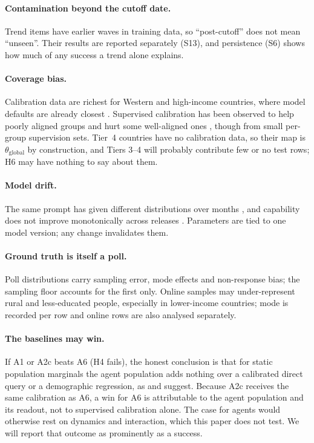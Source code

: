 \documentclass[11pt]{article}
\begin{document}
\paragraph{Contamination beyond the cutoff date.} Trend items have earlier waves in training data, so ``post-cutoff'' does not mean ``unseen''. Their results are reported separately (S13), and persistence (S6) shows how much of any success a trend alone explains.

\paragraph{Coverage bias.} Calibration data are richest for Western and high-income countries, where model defaults are already closest \citep{durmus2023global,tao2024cultural}. Supervised calibration has been observed to help poorly aligned groups and hurt some well-aligned ones \citep{kambhatla2025supervision}, though from small per-group supervision sets. Tier~4 countries have no calibration data, so their map is $\theta_{\text{global}}$ by construction, and Tiers 3--4 will probably contribute few or no test rows; H6 may have nothing to say about them.

\paragraph{Model drift.} The same prompt has given different distributions over months \citep{bisbee2024synthetic}, and capability does not improve monotonically across releases \citep{lee2026openweight}. Parameters are tied to one model version; any change invalidates them.

\paragraph{Ground truth is itself a poll.} Poll distributions carry sampling error, mode effects and non-response bias; the sampling floor accounts for the first only. Online samples may under-represent rural and less-educated people, especially in lower-income countries; mode is recorded per row and online rows are also analysed separately.

\paragraph{The baselines may win.} If A1 or A2c beats A6 (H4 fails), the honest conclusion is that for static population marginals the agent population adds nothing over a calibrated direct query or a demographic regression, as \citet{doudkin2026marginal} and \citet{chen2026synthetic} suggest. Because A2c receives the same calibration as A6, a win for A6 is attributable to the agent population and its readout, not to supervised calibration alone. The case for agents would otherwise rest on dynamics and interaction, which this paper does not test. We will report that outcome as prominently as a success.
\end{document}
